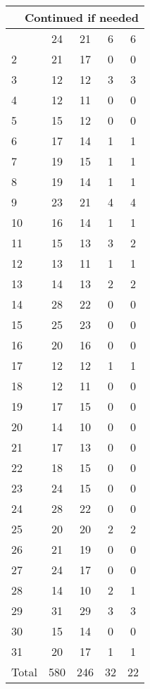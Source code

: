\begin{center}
\begin{longtable}{l|c|c|c|c}
\hline \multicolumn{5}{|r|}{{Continued if needed}} \\ \hline
\endfoot 
1 & 24 & 21 & 6 & 6\\ \hline
2 & 21 & 17 & 0 & 0\\ \hline
3 & 12 & 12 & 3 & 3\\ \hline
4 & 12 & 11 & 0 & 0\\ \hline
5 & 15 & 12 & 0 & 0\\ \hline
6 & 17 & 14 & 1 & 1\\ \hline
7 & 19 & 15 & 1 & 1\\ \hline
8 & 19 & 14 & 1 & 1\\ \hline
9 & 23 & 21 & 4 & 4\\ \hline
10 & 16 & 14 & 1 & 1\\ \hline
11 & 15 & 13 & 3 & 2\\ \hline
12 & 13 & 11 & 1 & 1\\ \hline
13 & 14 & 13 & 2 & 2\\ \hline
14 & 28 & 22 & 0 & 0\\ \hline
15 & 25 & 23 & 0 & 0\\ \hline
16 & 20 & 16 & 0 & 0\\ \hline
17 & 12 & 12 & 1 & 1\\ \hline
18 & 12 & 11 & 0 & 0\\ \hline
19 & 17 & 15 & 0 & 0\\ \hline
20 & 14 & 10 & 0 & 0\\ \hline
21 & 17 & 13 & 0 & 0\\ \hline
22 & 18 & 15 & 0 & 0\\ \hline
23 & 24 & 15 & 0 & 0\\ \hline
24 & 28 & 22 & 0 & 0\\ \hline
25 & 20 & 20 & 2 & 2\\ \hline
26 & 21 & 19 & 0 & 0\\ \hline
27 & 24 & 17 & 0 & 0\\ \hline
28 & 14 & 10 & 2 & 1\\ \hline
29 & 31 & 29 & 3 & 3\\ \hline
30 & 15 & 14 & 0 & 0\\ \hline
31 & 20 & 17 & 1 & 1\\ \hline
\hline \hline
Total & 580 & 246 & 32 & 22



\end{longtable}
\end{center}

 
